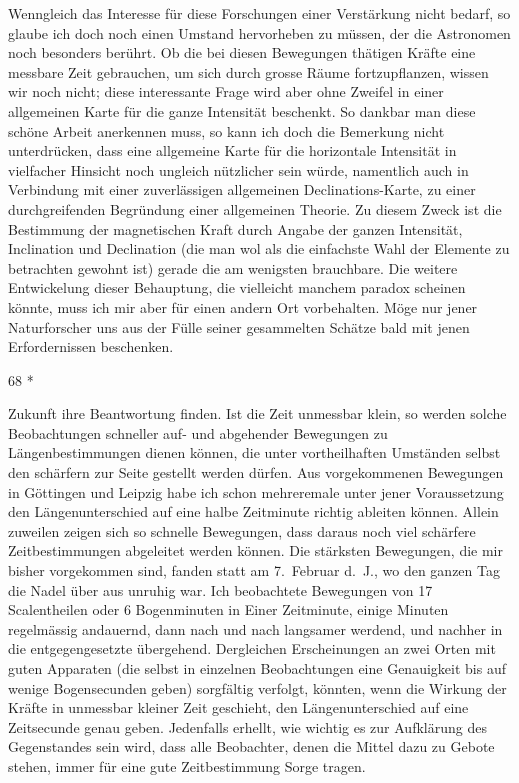 \documentclass[12pt,a4paper]{article}
\begin{document}
Wenngleich das Interesse f\"ur diese Forschungen einer Verst\"arkung nicht bedarf, so glaube ich doch noch einen Umstand hervorheben zu m\"ussen, der die Astronomen noch besonders ber\"uhrt. Ob die bei diesen Bewegungen th\"atigen Kr\"afte eine messbare Zeit gebrauchen, um sich durch grosse R\"aume fortzupflanzen, wissen wir noch nicht; diese interessante Frage wird aber ohne Zweifel in einer allgemeinen Karte f\"ur die ganze Intensit\"at beschenkt. So dankbar man diese sch\"one Arbeit anerkennen muss, so kann ich doch die Bemerkung nicht unterdr\"ucken, dass eine allgemeine Karte f\"ur die horizontale Intensit\"at in vielfacher Hinsicht noch ungleich n\"utzlicher sein w\"urde, namentlich auch in Verbindung mit einer zuverl\"assigen allgemeinen Declinations-Karte, zu einer durchgreifenden Begr\"undung einer allgemeinen Theorie. Zu diesem Zweck ist die Bestimmung der magnetischen Kraft durch Angabe der ganzen Intensit\"at, Inclination und Declination (die man wol als die einfachste Wahl der Elemente zu betrachten gewohnt ist) gerade die am wenigsten brauchbare. Die weitere Entwickelung dieser Behauptung, die vielleicht manchem paradox scheinen k\"onnte, muss ich mir aber f\"ur einen andern Ort vorbehalten. M\"oge nur jener Naturforscher uns aus der F\"ulle seiner gesammelten Sch\"atze bald mit jenen Erfordernissen beschenken.

\begin{flushright}
68 *
\end{flushright}

\newpage
\noindent
Zukunft ihre Beantwortung finden. Ist die Zeit unmessbar klein, so werden solche Beobachtungen schneller auf- und abgehender Bewegungen zu L\"angenbestimmungen dienen k\"onnen, die unter vortheilhaften Umst\"anden selbst den sch\"arfern zur Seite gestellt werden d\"urfen. Aus vorgekommenen Bewegungen in G\"ottingen und Leipzig habe ich schon mehreremale unter jener Voraussetzung den L\"angenunterschied auf eine halbe Zeitminute richtig ableiten k\"onnen. Allein zuweilen zeigen sich so schnelle Bewegungen, dass daraus noch viel sch\"arfere Zeitbestimmungen abgeleitet werden k\"onnen. Die st\"arksten Bewegungen, die mir bisher vorgekommen sind, fanden statt am 7.~Februar d.~J., wo den ganzen Tag die Nadel \"uber aus unruhig war. Ich beobachtete Bewegungen von 17 Scalentheilen oder 6 Bogenminuten in Einer Zeitminute, einige Minuten regelm\"assig andauernd, dann nach und nach langsamer werdend, und nachher in die entgegengesetzte \"ubergehend. Dergleichen Erscheinungen an zwei Orten mit guten Apparaten (die selbst in einzelnen Beobachtungen eine Genauigkeit bis auf wenige Bogensecunden geben) sorgf\"altig verfolgt, k\"onnten, wenn die Wirkung der Kr\"afte in unmessbar kleiner Zeit geschieht, den L\"angenunterschied auf eine Zeitsecunde genau geben. Jedenfalls erhellt, wie wichtig es zur Aufkl\"arung des Gegenstandes sein wird, dass alle Beobachter, denen die Mittel dazu zu Gebote stehen, immer f\"ur eine gute Zeitbestimmung Sorge tragen.
\end{document}
